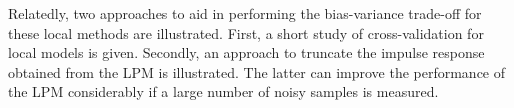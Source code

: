 Relatedly, two approaches to aid in performing the bias-variance trade-off for these local methods are illustrated.
First, a short study of cross-validation for local models is given.
Secondly, an approach to truncate the impulse response obtained from the \gls{LPM} is illustrated.
The latter can improve the performance of the \gls{LPM} considerably if a large number of noisy samples is measured.


% 
